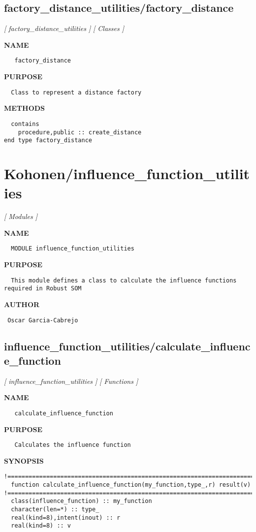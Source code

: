 \documentclass{article}
\begin{document}
\subsection{factory\_distance\_utilities/factory\_distance}
\textsl{[ factory\_distance\_utilities ]}
\textsl{[ Classes ]}

\label{ch:robo14}
\label{ch:factory_distance_utilities_factory_distance}
\textbf{NAME}
\begin{verbatim}
   factory_distance
\end{verbatim}
\textbf{PURPOSE}
\begin{verbatim}
  Class to represent a distance factory 
\end{verbatim}
\textbf{METHODS}
\begin{verbatim}
  contains
    procedure,public :: create_distance
end type factory_distance
\end{verbatim}
\newpage
\section{Kohonen/influence\_function\_utilities}
\textsl{[ Modules ]}

\label{ch:robo3}
\label{ch:Kohonen_influence_function_utilities}
\textbf{NAME}
\begin{verbatim}
  MODULE influence_function_utilities
\end{verbatim}
\textbf{PURPOSE}
\begin{verbatim}
  This module defines a class to calculate the influence functions required in Robust SOM 
\end{verbatim}
\textbf{AUTHOR}
\begin{verbatim}
 Oscar Garcia-Cabrejo

\end{verbatim}
\newpage
\subsection{influence\_function\_utilities/calculate\_influence\_function}
\textsl{[ influence\_function\_utilities ]}
\textsl{[ Functions ]}

\label{ch:robo15}
\label{ch:influence_function_utilities_calculate_influence_function}
\textbf{NAME}
\begin{verbatim}
   calculate_influence_function
\end{verbatim}
\textbf{PURPOSE}
\begin{verbatim}
   Calculates the influence function
\end{verbatim}
\textbf{SYNOPSIS}
\begin{verbatim}
!========================================================================================
  function calculate_influence_function(my_function,type_,r) result(v)
!========================================================================================
  class(influence_function) :: my_function
  character(len=*) :: type_ 
  real(kind=8),intent(inout) :: r 
  real(kind=8) :: v
\end{verbatim}
\newpage
\end{document}
